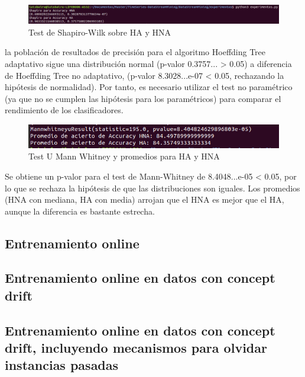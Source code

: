 \begin{figure}[H] %
	\centering
	\includegraphics[scale=0.35]{off1.png}  %
	\caption{Test de Shapiro-Wilk sobre HA y HNA} 
	\label{fig:off4}
\end{figure}
 
la población de resultados de precisión para el algoritmo Hoeffding Tree adaptativo sigue una distribución normal (p-valor 0.3757... > 0.05) a diferencia de Hoeffding Tree no adaptativo, (p-valor 8.3028...e-07 < 0.05, rechazando la hipótesis de normalidad). Por tanto, es necesario utilizar el test no paramétrico (ya que no se cumplen las hipótesis para los paramétricos) para comparar el rendimiento de los clasificadores. 

\begin{figure}[H] %
	\centering
	\includegraphics[scale=0.5]{off2.png}  %
	\caption{Test U Mann Whitney y promedios para HA y HNA} 
	\label{fig:off5}
\end{figure}

Se obtiene un p-valor para el test de Mann-Whitney de 8.4048...e-05 < 0.05, por lo que se rechaza la hipótesis de que las distribuciones son iguales. Los promedios (HNA con mediana, HA con media) arrojan que el HNA es mejor que el HA, aunque la diferencia es bastante estrecha. 
\subsection{Entrenamiento online}

\subsection{Entrenamiento online en datos con concept drift}

\subsection{Entrenamiento online en datos con concept drift, incluyendo mecanismos para olvidar instancias pasadas}

